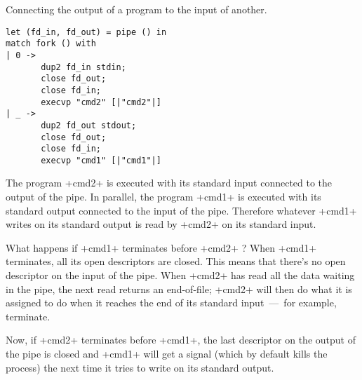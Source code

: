 \begin{example} Connecting the output of a program to the input of another.
%
\begin{lstlisting}
let (fd_in, fd_out) = pipe () in
match fork () with
| 0 -> 
       dup2 fd_in stdin;
       close fd_out;
       close fd_in;
       execvp "cmd2" [|"cmd2"|]
| _ -> 
       dup2 fd_out stdout;
       close fd_out;
       close fd_in;
       execvp "cmd1" [|"cmd1"|]
\end{lstlisting}
%
The program \ml+cmd2+ is executed with its standard input connected to
the output of the pipe. In parallel, the program \ml+cmd1+ is executed
with its standard output connected to the input of the pipe. Therefore
whatever \ml+cmd1+ writes on its standard output is read by \ml+cmd2+
on its standard input.

What happens if \ml+cmd1+ terminates before \ml+cmd2+ ? When \ml+cmd1+
terminates, all its open descriptors are closed.  This means that there's no
open descriptor on the input of the pipe. When \ml+cmd2+ has read all
the data waiting in the pipe, the next read returns an end-of-file;
\ml+cmd2+ will then do what it is assigned to do when it reaches the
end of its standard input~---~for example, terminate. 


Now,  if \ml+cmd2+ terminates before \ml+cmd1+, the last descriptor on
the output of the pipe is closed and \ml+cmd1+ will get
a signal (which by default kills the process) the next time
it tries to write on its standard output. 


\end{example}

